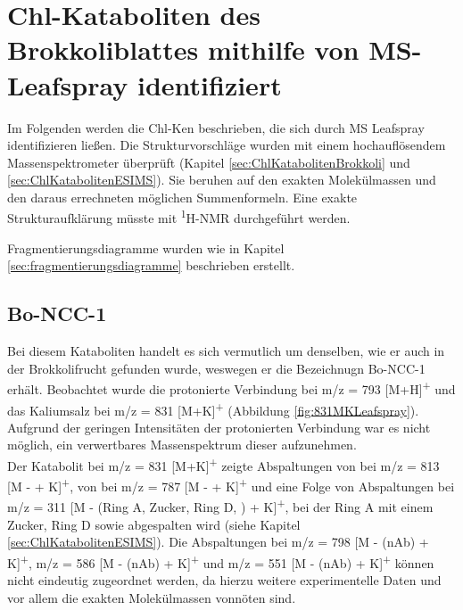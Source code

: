 \section{Chl-Kataboliten des Brokkoliblattes mithilfe von MS-Leafspray identifiziert}

Im Folgenden werden die \gls{Chl-K}en beschrieben, die sich durch MS Leafspray identifizieren ließen. Die Strukturvorschläge wurden mit einem hochauflösendem Massenspektrometer überprüft (Kapitel \ref{sec:ChlKatabolitenBrokkoli} und \ref{sec:ChlKatabolitenESIMS}). Sie beruhen auf den exakten Molekülmassen und den daraus errechneten möglichen Summenformeln. Eine exakte Strukturaufklärung müsste mit \textsuperscript{1}H-NMR durchgeführt werden. 

Fragmentierungsdiagramme wurden wie in Kapitel \ref{sec:fragmentierungsdiagramme} beschrieben erstellt.

\subsection{Bo-NCC-1} \label{sec:MSLeafsprayBoNCC1}

Bei diesem Kataboliten handelt es sich vermutlich um denselben, wie er auch in der Brokkolifrucht gefunden wurde, weswegen er die Bezeichnugn Bo-NCC-1 erhält. \cite{ChlorophyllCatabolitesBroccoli} Beobachtet wurde die protonierte Verbindung bei m/z = 793 [M+H]\textsuperscript{+} und das Kaliumsalz bei m/z = 831 [M+K]\textsuperscript{+} (Abbildung \ref{fig:831MKLeafspray}). Aufgrund der geringen Intensitäten der protonierten Verbindung war es nicht möglich, ein verwertbares Massenspektrum dieser aufzunehmen. \\

Der Katabolit bei m/z = 831 [M+K]\textsuperscript{+} zeigte Abspaltungen von  bei m/z = 813 [M -  + K]\textsuperscript{+}, von  bei m/z = 787 [M -  + K]\textsuperscript{+} und eine Folge von Abspaltungen bei m/z = 311 [M - (Ring A, Zucker, Ring D, ) + K]\textsuperscript{+}, bei der Ring A mit einem Zucker, Ring D sowie  abgespalten wird (siehe Kapitel \ref{sec:ChlKatabolitenESIMS}). Die Abspaltungen bei m/z = 798 [M - (\gls{nAb}) + K]\textsuperscript{+}, m/z = 586 [M - (\gls{nAb}) + K]\textsuperscript{+} und m/z = 551 [M - (\gls{nAb}) + K]\textsuperscript{+} können nicht eindeutig zugeordnet werden, da hierzu weitere experimentelle Daten und vor allem die exakten Molekülmassen vonnöten sind. 


